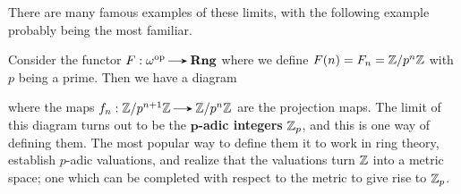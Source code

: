     There are many famous examples of these limits, with the
    following example probably being the most familiar. 

    \begin{example}
        Consider the functor $F: \omega\op \to \textbf{Rng}$ where 
        we define $F(n) = F_n = \mathbb{Z}/p^n\mathbb{Z}$ with $p$ being a prime. 
        Then we have a diagram 
        \begin{center}
        \end{center}
        where the maps $f_n: \zz/p^{n+1}\zz \to \zz/p^n\zz$ are the 
        projection maps. The limit of this diagram turns out to be the  
        \textbf{$\bm{p}$-adic integers} $\mathbb{Z}_p$, and this is one way of
        defining them. The most popular way to define them it to work
        in ring theory, establish $p$-adic valuations, and realize
        that the 
        valuations turn $\mathbb{Z}$ into a metric space; one which can be 
        completed with respect to the metric to give rise to $\mathbb{Z}_p$.


\end{example}
